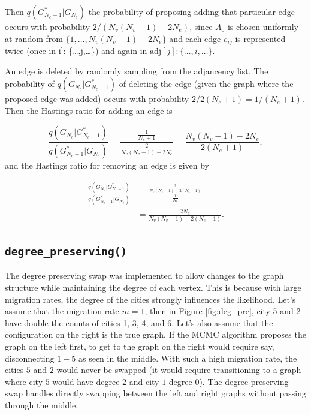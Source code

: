 \documentclass[11pt,a4paper]{article}
\begin{document}
Then \(q(G^*_{N_e+1}|G_{N_e})\) the probability of proposing adding that
particular edge occurs with probability \(2/(N_v(N_v-1) - 2N_e)\), since
\(A_0\) is chosen uniformly at random from
\(\{1,\dots,N_v(N_v-1) - 2N_e\}\) and each edge \(e_{ij}\) is
represented twice (once in \text{adj}{[}i{]}: \{\dots,j,\dots\}) and
again in \(\text{adj}[j]: \{\dots,i,\dots\}\).

An edge is deleted by randomly sampling from the adjancency list. The
probability of \(q(G_{N_e}|G^*_{N_e+1})\) of deleting the edge (given
the graph where the proposed edge was added) occurs with probability
\(2/2(N_e+1) = 1/(N_e+1)\). Then the Hastings ratio for adding an edge
is

\[\frac{q(G_{N_e}|G^*_{N_e+1})}{q(G^*_{N_e+1}|G_{N_e})} = \frac{\frac{1}{N_e+1}}{\frac{2}{N_v(N_v-1) - 2N_e}} = \frac{N_v(N_v-1) - 2N_e}{2(N_e+1)},\]
and the Hastings ratio for removing an edge is given by

\[  \begin{aligned} \frac{q(G_{N_e}|G^*_{N_e-1})}{q(G^*_{N_e-1}|G_{N_e})} & = \frac{\frac{2}{N_v(N_v-1) - 2(N_e-1)}}{\frac{1}{N_e}} \\ &= \frac{2N_e}{N_v(N_v-1) - 2(N_e-1)}. \end{aligned}\]

\hypertarget{degree_preserving}{%
\subsection{\texorpdfstring{\texttt{degree\_preserving()}}{degree\_preserving()}}\label{degree_preserving}}

The degree preserving swap was implemented to allow changes to the graph
structure while maintaining the degree of each vertex. This is because
with large migration rates, the degree of the cities strongly influences
the likelihood. Let's assume that the migration rate \(m = 1\), then in
Figure \ref{fig:deg_pre}, city 5 and 2 have double the counts of cities
1, 3, 4, and 6. Let's also assume that the configuration on the right is
the true graph. If the MCMC algorithm proposes the graph on the left
first, to get to the graph on the right would require say, disconnecting
\(1-5\) as seen in the middle. With such a high migration rate, the
cities \(5\) and \(2\) would never be swapped (it would require
transitioning to a graph where city \(5\) would have degree \(2\) and
city \(1\) degree 0). The degree preserving swap handles directly
swapping between the left and right graphs without passing through the
middle.
\end{document}
